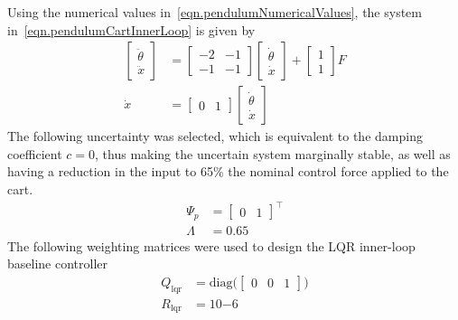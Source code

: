 Using the numerical values in\ \eqref{eqn.pendulumNumericalValues}, the system in\ \eqref{eqn.pendulumCartInnerLoop} is given by
\begin{equation*}
  \begin{split}
    \begin{bmatrix}
      \ddot{\theta} \\
      \ddot{x}
    \end{bmatrix}
    &=
    \begin{bmatrix}
      -2 & -1 \\
      -1 & -1
    \end{bmatrix}
    \begin{bmatrix}
      \dot{\theta} \\
      \dot{x}
    \end{bmatrix}
    +
    \begin{bmatrix}
      1 \\
      1
    \end{bmatrix}
    F \\
    \dot{x}
    &=
    \begin{bmatrix}
      0 & 1
    \end{bmatrix}
    \begin{bmatrix}
      \dot{\theta} \\
      \dot{x}
    \end{bmatrix}
  \end{split}
\end{equation*}
The following uncertainty was selected, which is equivalent to the damping coefficient $c=0$, thus making the uncertain system marginally stable, as well as having a reduction in the input to 65\% the nominal control force applied to the cart.
\begin{equation*}
  \begin{split}
    \Psi_{p}
    &=
    \begin{bmatrix}
      0 & 1
    \end{bmatrix}^{\top} \\
    \Lambda
    &=
    0.65
  \end{split}
\end{equation*}
The following weighting matrices were used to design the LQR inner-loop baseline controller
\begin{equation*}
  \begin{split}
    Q_{\text{lqr}}
    &=
    \text{diag}\bigr(
    \begin{bmatrix}
    0 & 0 & 1
    \end{bmatrix}\bigr) \\
    R_{\text{lqr}}
    &=
    10{-6}
  \end{split}
\end{equation*}
